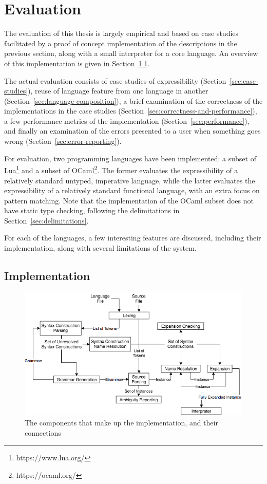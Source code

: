 \documentclass{kththesis}
\begin{document}
\chapter{Evaluation} \label{sec:evaluation}

The evaluation of this thesis is largely empirical and based on case studies facilitated by a proof of concept implementation of the descriptions in the previous section, along with a small interpreter for a core language. An overview of this implementation is given in Section~\ref{sec:implementation}.

The actual evaluation consists of case studies of expressibility (Section~\ref{sec:case-studies}), reuse of language feature from one language in another (Section~\ref{sec:language-composition}), a brief examination of the correctness of the implementations in the case studies (Section~\ref{sec:correctness-and-performance}), a few performance metrics of the implementation (Section~\ref{sec:performance}), and finally an examination of the errors presented to a user when something goes wrong (Section~\ref{sec:error-reporting}).

For evaluation, two programming languages have been implemented: a subset of Lua\footnote{https://www.lua.org/} and a subset of OCaml\footnote{https://ocaml.org/}. The former evaluates the expressibility of a relatively standard untyped, imperative language, while the latter evaluates the expressibility of  a relatively standard functional language, with an extra focus on pattern matching. Note that the implementation of the OCaml subset does not have static type checking, following the delimitations in Section~\ref{sec:delimitations}.

For each of the languages, a few interesting features are discussed, including their implementation, along with several limitations of the system.

\section{Implementation} \label{sec:implementation}

\begin{figure}[t]
\includegraphics[width=\textwidth]{resources/implementation-flowchart}
\caption{The components that make up the implementation, and their connections}
\label{fig:implementation-flowchart}
\end{figure}
\end{document}
